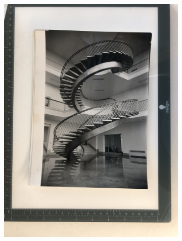 \begin{figure}[H]
\begin{subfigure}{0.24\textwidth}
        \includegraphics[width=\linewidth]{Illustrations/P11.jpg}
        \caption{}
    \end{subfigure}
    \begin{subfigure}{0.24\textwidth}

\end{subfigure}
\end{figure}
